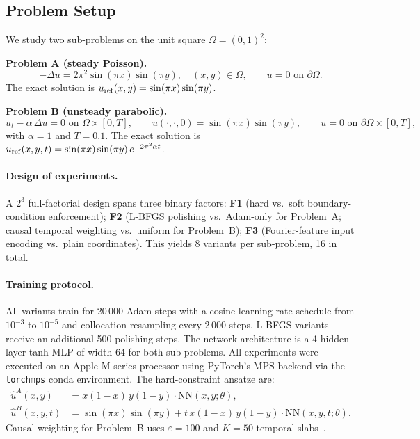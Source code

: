 \documentclass{article}
\begin{document}
\subsection{Problem Setup}

We study two sub-problems on the unit square $\Omega = (0,1)^2$:

\textbf{Problem A (steady Poisson).}
\begin{equation}
  -\Delta u = 2\pi^2 \sin(\pi x)\sin(\pi y), \quad (x,y)\in\Omega, \qquad
  u = 0 \text{ on } \partial\Omega.
\label{eq:prob_A}
\end{equation}
The exact solution is $u_{\rm ref}(x,y) = \sin(\pi x)\sin(\pi y)$.

\textbf{Problem B (unsteady parabolic).}
\begin{equation}
  u_t - \alpha\,\Delta u = 0 \text{ on } \Omega\times[0,T], \qquad
  u(\cdot,\cdot,0) = \sin(\pi x)\sin(\pi y), \qquad
  u = 0 \text{ on } \partial\Omega\times[0,T],
\label{eq:prob_B}
\end{equation}
with $\alpha=1$ and $T=0.1$.
The exact solution is $u_{\rm ref}(x,y,t) = \sin(\pi x)\sin(\pi y)\,e^{-2\pi^2\alpha t}$.

\paragraph{Design of experiments.}
A $2^3$ full-factorial design spans three binary factors:
\textbf{F1} (hard vs.\ soft boundary-condition enforcement);
\textbf{F2} (L-BFGS polishing vs.\ Adam-only for Problem~A;
causal temporal weighting vs.\ uniform for Problem~B);
\textbf{F3} (Fourier-feature input encoding vs.\ plain coordinates).
This yields 8 variants per sub-problem, 16 in total.

\paragraph{Training protocol.}
All variants train for 20\,000 Adam steps with a cosine learning-rate schedule
from $10^{-3}$ to $10^{-5}$ and collocation resampling every 2\,000 steps.
L-BFGS variants receive an additional 500 polishing steps.
The network architecture is a 4-hidden-layer tanh MLP of width 64 for both
sub-problems.
All experiments were executed on an Apple M-series processor using PyTorch's
MPS backend via the \texttt{torchmps} conda environment.
The hard-constraint ansatze are:
\begin{align}
  \hat{u}^A(x,y)    &= x(1{-}x)\,y(1{-}y)\cdot\mathrm{NN}(x,y;\theta), \label{eq:hard_A}\\
  \hat{u}^B(x,y,t)  &= \sin(\pi x)\sin(\pi y)
                       + t\,x(1{-}x)\,y(1{-}y)\cdot\mathrm{NN}(x,y,t;\theta). \label{eq:hard_B}
\end{align}
Causal weighting for Problem~B uses $\varepsilon=100$ and $K=50$ temporal
slabs~\citep{wang2022causal}.
\end{document}
